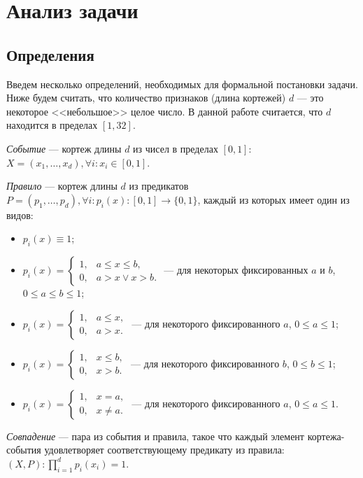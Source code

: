 \documentclass[14pt]{article}
\begin{document}
\section{Анализ задачи}
\subsection{Определения}
Введем несколько определений, необходимых для формальной постановки задачи. 
Ниже будем считать, что количество признаков (длина кортежей) $d$ --- это некоторое <<небольшое>> целое число. 
В данной работе считается, что $d$ находится в пределах $[1, 32]$.

\emph{Событие} --- кортеж длины $d$ из чисел в пределах $[0, 1]$: $X = (x_1,\ldots,x_d), \forall i: x_i \in [0, 1]$.

\emph{Правило} --- кортеж длины $d$ из предикатов $P = (p_1,\ldots,p_d), \forall i: p_i(x): [0, 1] \rightarrow \{0, 1\}$, каждый из которых имеет один из видов:
\begin{itemize}
    \item $p_i(x) \equiv 1$;
    \item $ p_i(x) = 
        \begin{cases} 
        1, & a \leq x \leq b, \\
        0, & a > x \vee x > b.
        \end{cases}
    $ --- для некоторых фиксированных $a$ и $b$, $0 \leq a \leq b \leq 1$;
    \item $ p_i(x) = 
        \begin{cases} 
        1, & a \leq x, \\
        0, & a > x.
        \end{cases}
    $ --- для некоторого фиксированного $a$, $0 \leq a \leq 1$;
    \item $ p_i(x) = 
        \begin{cases} 
        1, & x \leq b, \\
        0, & x > b.
        \end{cases}
    $ --- для некоторого фиксированного $b$, $0 \leq b \leq 1$;
    \item $ p_i(x) = 
        \begin{cases} 
        1, & x = a, \\
        0, & x \neq a.
        \end{cases}
    $ --- для некоторого фиксированного $a$, $0 \leq a \leq 1$.
\end{itemize}

\emph{Совпадение} --- пара из события и правила, такое что каждый элемент кортежа-события удовлетворяет соответствующему предикату из правила: $(X, P): \prod_{i=1}^d p_i(x_i) = 1$.
\end{document}
